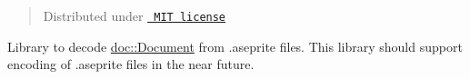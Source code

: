 \begin{quote}
Distributed under \href{LICENSE.txt}{\texttt{ MIT license}} \end{quote}
Library to decode {\ttfamily \mbox{\hyperlink{classdoc_1_1_document}{doc\+::\+Document}}} from {\ttfamily .aseprite} files. This library should support encoding of {\ttfamily .aseprite} files in the near future. 